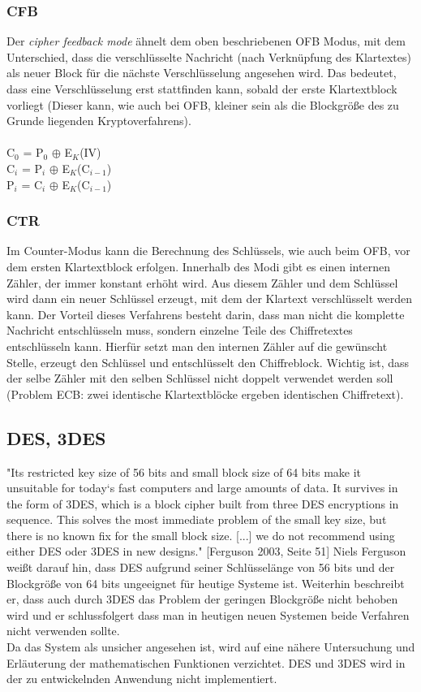 \documentclass[10pt, a4paper]{scrreprt}
\begin{document}
\subsubsection{CFB}
Der \textit{cipher feedback mode} ähnelt dem oben beschriebenen OFB Modus, mit dem Unterschied, dass die verschlüsselte Nachricht (nach Verknüpfung des Klartextes) als neuer Block für die nächste Verschlüsselung angesehen wird. Das bedeutet, dass eine Verschlüsselung erst stattfinden kann, sobald der erste Klartextblock vorliegt (Dieser kann, wie auch bei OFB, kleiner sein als die Blockgröße des zu Grunde liegenden Kryptoverfahrens). \\ \\
C$_{0}$ = P$_{0}$ $\oplus$ E$_{K}$(IV) \\
C$_{i}$ = P$_{i}$ $\oplus$ E$_{K}$(C$_{i-1}$) \\
P$_{i}$ = C$_{i}$ $\oplus$ E$_{K}$(C$_{i-1}$) \\

\subsubsection{CTR}
Im Counter-Modus kann die Berechnung des Schlüssels, wie auch beim OFB, vor dem ersten Klartextblock erfolgen. Innerhalb des Modi gibt es einen internen Zähler, der immer konstant erhöht wird. Aus diesem Zähler und dem Schlüssel wird dann ein neuer Schlüssel erzeugt, mit dem der Klartext verschlüsselt werden kann. Der Vorteil dieses Verfahrens besteht darin, dass man nicht die komplette Nachricht entschlüsseln muss, sondern einzelne Teile des Chiffretextes entschlüsseln kann. Hierfür setzt man den internen Zähler auf die gewünscht Stelle, erzeugt den Schlüssel und entschlüsselt den Chiffreblock. Wichtig ist, dass der selbe Zähler mit den selben Schlüssel nicht doppelt verwendet werden soll (Problem ECB: zwei identische Klartextblöcke ergeben identischen Chiffretext).

\subsection{DES, 3DES}
"Its restricted key size of 56 bits and small block size of 64 bits make it unsuitable for today`s fast computers and large amounts of data. It survives in the form of 3DES, which is a block cipher built from three DES encryptions in sequence. This solves the most immediate problem of the small key size, but there is no known fix for the small block size. [...] we do not recommend using either DES oder 3DES in new designs." [Ferguson 2003, Seite 51]
Niels Ferguson weißt darauf hin, dass DES aufgrund seiner Schlüsselänge von 56 bits und der Blockgröße von 64 bits ungeeignet für heutige Systeme ist. Weiterhin beschreibt er, dass auch durch 3DES das Problem der geringen Blockgröße nicht behoben wird und er schlussfolgert dass man in heutigen neuen Systemen beide Verfahren nicht verwenden sollte. \\
Da das System als unsicher angesehen ist, wird auf eine nähere Untersuchung und Erläuterung der mathematischen Funktionen verzichtet. DES und 3DES wird in der zu entwickelnden Anwendung nicht implementiert.
\end{document}
